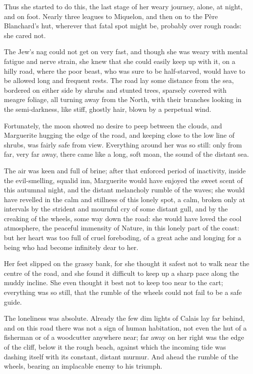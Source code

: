 \documentclass[paper=5.5in:8.5in,BCOR=7mm,twoside,DIV=calc,12pt,usegeometry,chapterprefix,endperiod,headings=big]{scrbook}
\begin{document}
Thus she started to do this, the last stage of her weary journey, alone, at night, and on foot. Nearly three leagues to Miquelon, and then on to the Père Blanchard's hut, wherever that fatal spot might be, probably over rough roads: she cared not.

The Jew's nag could not get on very fast, and though she was weary with mental fatigue and nerve strain, she knew that she could easily keep up with it, on a hilly road, where the poor beast, who was sure to be half-starved, would have to be allowed long and frequent rests. The road lay some distance from the sea, bordered on either side by shrubs and stunted trees, sparsely covered with meagre foliage, all turning away from the North, with their branches looking in the semi-darkness, like stiff, ghostly hair, blown by a perpetual wind.

Fortunately, the moon showed no desire to peep between the clouds, and Marguerite hugging the edge of the road, and keeping close to the low line of shrubs, was fairly safe from view. Everything around her was so still: only from far, very far away, there came like a long, soft moan, the sound of the distant sea.

The air was keen and full of brine; after that enforced period of inactivity, inside the evil-smelling, squalid inn, Marguerite would have enjoyed the sweet scent of this autumnal night, and the distant melancholy rumble of the waves; she would have revelled in the calm and stillness of this lonely spot, a calm, broken only at intervals by the strident and mournful cry of some distant gull, and by the creaking of the wheels, some way down the road: she would have loved the cool atmosphere, the peaceful immensity of Nature, in this lonely part of the coast: but her heart was too full of cruel foreboding, of a great ache and longing for a being who had become infinitely dear to her.

Her feet slipped on the grassy bank, for she thought it safest not to walk near the centre of the road, and she found it difficult to keep up a sharp pace along the muddy incline. She even thought it best not to keep too near to the cart; everything was so still, that the rumble of the wheels could not fail to be a safe guide.

The loneliness was absolute. Already the few dim lights of Calais lay far behind, and on this road there was not a sign of human habitation, not even the hut of a fisherman or of a woodcutter anywhere near; far away on her right was the edge of the cliff, below it the rough beach, against which the incoming tide was dashing itself with its constant, distant murmur. And ahead the rumble of the wheels, bearing an implacable enemy to his triumph.
\end{document}
